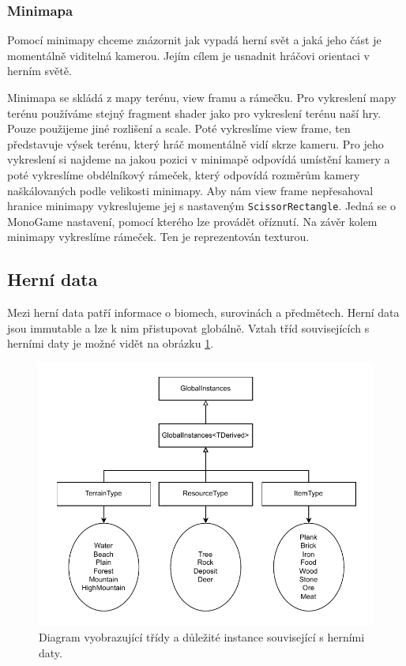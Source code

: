 \subsubsection{Minimapa}
Pomocí minimapy chceme znázornit jak vypadá herní svět a jaká jeho část je momentálně viditelná kamerou. Jejím cílem je usnadnit hráčovi orientaci v herním světě.

Minimapa se skládá z mapy terénu, view framu a rámečku. Pro vykreslení mapy terénu používáme stejný fragment shader jako pro vykreslení terénu naší hry. Pouze použijeme jiné rozlišení a scale. Poté vykreslíme view frame, ten představuje výsek terénu, který hráč momentálně vidí skrze kameru. Pro jeho vykreslení si najdeme na jakou pozici v minimapě odpovídá umístění kamery a poté vykreslíme obdélníkový rámeček, který odpovídá rozměrům kamery naškálovaných podle velikosti minimapy. Aby nám view frame nepřesahoval hranice minimapy vykreslujeme jej s nastaveným \texttt{ScissorRectangle}. Jedná se o MonoGame nastavení, pomocí kterého lze provádět oříznutí. Na závěr kolem minimapy vykreslíme rámeček. Ten je reprezentován texturou.

\subsection{Herní data}
Mezi herní data patří informace o biomech, surovinách a předmětech. Herní data jsou immutable a lze k nim přistupovat globálně. Vztah tříd souvisejících s herními daty je možné vidět na obrázku \ref{fig:game-data}.

\begin{figure}[!htb]
  \centering
  \includegraphics[width=0.8\linewidth]{img/game-data.pdf}
  \caption{Diagram vyobrazující třídy a důležité instance související s herními daty.}
  \label{fig:game-data}
\end{figure}

